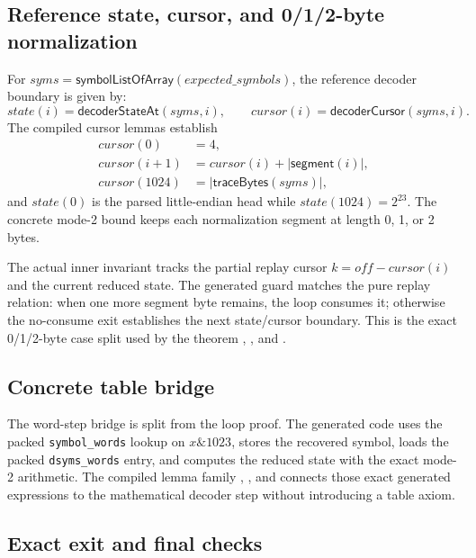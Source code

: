 \subsection*{Reference state, cursor, and 0/1/2-byte normalization}

For \(syms=\mathsf{symbolListOfArray}(expected\_symbols)\), the reference
decoder boundary is given by:
\[
  state(i)=\mathsf{decoderStateAt}(syms,i),\qquad
  cursor(i)=\mathsf{decoderCursor}(syms,i).
\]
The compiled cursor lemmas establish
\[
\begin{aligned}
  cursor(0)&=4,\\
  cursor(i+1)&=cursor(i)+|\mathsf{segment}(i)|,\\
  cursor(1024)&=|\mathsf{traceBytes}(syms)|,
\end{aligned}
\]
and \(state(0)\) is the parsed little-endian head while \(state(1024)=2^{23}\).
The concrete mode-2 bound keeps each normalization segment at length
0, 1, or 2 bytes.

The actual inner invariant tracks the partial replay cursor
\(k=off-cursor(i)\) and the current reduced state.  The generated guard
matches the pure replay relation: when one more segment byte remains, the loop
consumes it; otherwise the no-consume exit establishes the next state/cursor
boundary.  This is the exact 0/1/2-byte case split used by the theorem
, ,
and .

\subsection*{Concrete table bridge}

The word-step bridge is split from the loop proof.  The generated code uses the
packed \texttt{symbol\_words} lookup on \(x \mathbin{\&} 1023\), stores the
recovered symbol, loads the packed \texttt{dsyms\_words} entry, and computes
the reduced state with the exact mode-2 arithmetic.  The compiled lemma family
,
, and
 connects those exact
generated expressions to the mathematical decoder step without introducing a
table axiom.

\subsection*{Exact exit and final checks}

